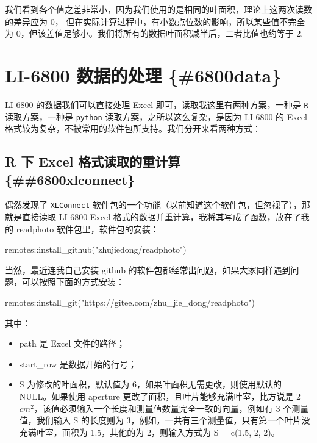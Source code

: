 \documentclass[
]{krantz}
\makeatletter
\newenvironment{Shaded}{\begin{snugshade}}{\end{snugshade}}
\newcommand{\FunctionTok}[1]{\textcolor[rgb]{0.00,0.00,0.00}{#1}}
\newcommand{\NormalTok}[1]{#1}
\newcommand{\SpecialCharTok}[1]{\textcolor[rgb]{0.00,0.00,0.00}{#1}}
\newcommand{\StringTok}[1]{\textcolor[rgb]{0.31,0.60,0.02}{#1}}
\newenvironment{kframe}{%
\medskip{}
\setlength{\fboxsep}{.8em}
 \def\at@end@of@kframe{}%
 \ifinner\ifhmode%
  \def\at@end@of@kframe{\end{minipage}}%
  \begin{minipage}{\columnwidth}%
 \fi\fi%
 \def\FrameCommand##1{\hskip\@totalleftmargin \hskip-\fboxsep
 \colorbox{shadecolor}{##1}\hskip-\fboxsep
     \hskip-\linewidth \hskip-\@totalleftmargin \hskip\columnwidth}%
 \MakeFramed {\advance\hsize-\width
   \@totalleftmargin\z@ \linewidth\hsize
   \@setminipage}}%
 {\par\unskip\endMakeFramed%
 \at@end@of@kframe}
\renewenvironment{Shaded}{\begin{kframe}}{\end{kframe}}
\makeatother
\begin{document}
我们看到各个值之差非常小，因为我们使用的是相同的叶面积，理论上这两次读数的差异应为 0， 但在实际计算过程中，有小数点位数的影响，所以某些值不完全为 0，但该差值足够小。我们将所有的数据叶面积减半后，二者比值也约等于 2.

\hypertarget{li-6800-ux6570ux636eux7684ux5904ux7406-6800data}{%
\section{LI-6800 数据的处理 \{\#6800data\}}\label{li-6800-ux6570ux636eux7684ux5904ux7406-6800data}}

LI-6800 的数据我们可以直接处理 Excel 即可，读取我这里有两种方案，一种是 \texttt{R} 读取方案，一种是 \texttt{python} 读取方案，之所以这么复杂，是因为 LI-6800 的 Excel 格式较为复杂，不被常用的软件包所支持。我们分开来看两种方式：

\hypertarget{r-ux4e0b-excel-ux683cux5f0fux8bfbux53d6ux7684ux91cdux8ba1ux7b97-6800xlconnect}{%
\subsection{R 下 Excel 格式读取的重计算 \{\#\#6800xlconnect\}}\label{r-ux4e0b-excel-ux683cux5f0fux8bfbux53d6ux7684ux91cdux8ba1ux7b97-6800xlconnect}}

偶然发现了 \texttt{XLConnect} 软件包的一个功能（以前知道这个软件包，但忽视了），那就是直接读取 LI-6800 Excel 格式的数据并重计算，我将其写成了函数，放在了我的 readphoto 软件包里，软件包的安装：

\begin{Shaded}
\begin{Highlighting}[]
\NormalTok{remotes}\SpecialCharTok{::}\FunctionTok{install\_github}\NormalTok{(}\StringTok{"zhujiedong/readphoto"}\NormalTok{)}
\end{Highlighting}
\end{Shaded}

当然，最近连我自己安装 github 的软件包都经常出问题，如果大家同样遇到问题，可以按照下面的方式安装：

\begin{Shaded}
\begin{Highlighting}[]
\NormalTok{remotes}\SpecialCharTok{::}\FunctionTok{install\_git}\NormalTok{(}\StringTok{"https://gitee.com/zhu\_jie\_dong/readphoto"}\NormalTok{)}
\end{Highlighting}
\end{Shaded}

其中：

\begin{itemize}
\item
  path 是 Excel 文件的路径；
\item
  start\_row 是数据开始的行号；
\item
  S 为修改的叶面积，默认值为 6，如果叶面积无需更改，则使用默认的 NULL。如果使用 aperture 更改了面积，且叶片能够充满叶室，比方说是 2 \(cm^2\)，该值必须输入一个长度和测量值数量完全一致的向量，例如有 3 个测量值，我们输入 S 的长度则为 3，例如，一共有三个测量值，只有第一个叶片没充满叶室，面积为 1.5，其他的为 2，则输入方式为 S = c(1.5, 2, 2)。
\end{itemize}
\end{document}
